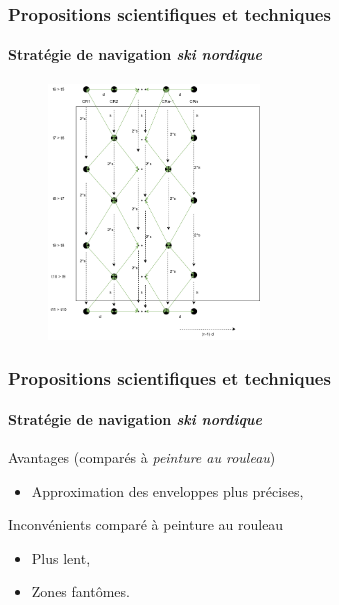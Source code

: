 \documentclass{beamer}
\begin{document}
			\begin{frame}
				\frametitle{Propositions scientifiques et techniques}
				\framesubtitle{Stratégie de navigation \textit{ski nordique}}
				\begin{figure}
					\centering
					\includegraphics[width=0.5\textwidth]{graphics/ski_nordique_2.png}
				\end{figure}
			\end{frame}
			\begin{frame}
				\frametitle{Propositions scientifiques et techniques}
				\framesubtitle{Stratégie de navigation \textit{ski nordique}}
				\begin{exampleblock}{Avantages (comparés à \textit{peinture au rouleau})}
					\begin{itemize}
						\item Approximation des enveloppes plus précises,
					\end{itemize}
				\end{exampleblock}
				\begin{alertblock}{Inconvénients comparé à peinture au rouleau}
					\begin{itemize}
						\item Plus lent,
						\item Zones fantômes.
					\end{itemize}
				\end{alertblock}
			\end{frame}
\end{document}
